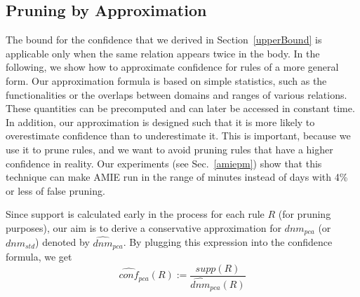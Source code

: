 {%
\subsection{Pruning by Approximation}
\label{subsec:pruningbyapprox}


The bound for the confidence that we derived in Section~\ref{upperBound} is applicable only when the same relation appears twice in the body.
In the following, we show how to approximate confidence for rules of a more general form. 
Our approximation formula is based on simple statistics, such as the functionalities or the overlaps between domains and ranges of various relations. These quantities
can be precomputed and can later be accessed in constant time. In addition, our approximation is designed such that it is more likely to overestimate confidence than to underestimate it.
This is important, because we use it to prune rules, and we want to avoid pruning rules that have a higher confidence in reality.
Our experiments (see Sec.~\ref{amiepm}) show that this technique can make AMIE run in the range of minutes instead of days with 4\% or less of false pruning.

Since support is calculated early in the process for each rule $R$ (for pruning purposes), 
our aim is to derive a conservative approximation for $dnm_{pca}$ (or $dnm_{std}$) denoted by
$\widehat{dnm}_{pca}$. By plugging this expression into the confidence formula, we get
\begin{equation} \label{eq:pcaApproxConf}
  \widehat{conf}_{pca}(R):=\frac{supp(R)}{\widehat{dnm}_{pca}(R)}
\end{equation}

}
